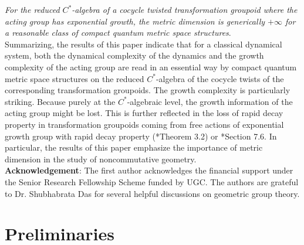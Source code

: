 \documentclass[a4paper,11pt,reqno]{amsart}
\theoremstyle{plain}
\theoremstyle{mainthmstyle}
\theoremstyle{named}
\numberwithin{equation}{section}
\begin{document}
{\it For the reduced $C^{\ast}$-algebra of a cocycle twisted transformation groupoid where the acting group has exponential growth, the metric dimension is generically $+\infty$ for a reasonable class of compact quantum metric space structures}.\vspace{0.05in}\\
 Summarizing, the results of this paper indicate that for a classical dynamical system, both the dynamical complexity of the dynamics and the growth complexity of the acting group are read in an essential way by compact quantum metric space structures on the reduced $C^{\ast}$-algebra of the cocycle twists of the corresponding transformation groupoids. The growth complexity is particularly striking. Because purely at the $C^{\ast}$-algebraic level, the growth information of the acting group might be lost. This is further reflected in the loss of rapid decay property in transformation groupoids coming from free actions of exponential growth group with rapid decay property (\cite{Weygandt-2024-Rapid-decay-for-etale-gpd}*{Theorem 3.2}) or \cite{buss2026rapid}*{Section 7.6}. In particular, the results of this paper emphasize the importance of metric dimension in the study of noncommutative geometry.\vspace{0.05in}\\
 {\bf Acknowledgement}: The first author acknowledges the financial support under the Senior Research Fellowship Scheme funded by UGC. The authors are grateful to Dr. Shubhabrata Das for several helpful discussions on geometric group theory.
\section{Preliminaries}
\end{document}
